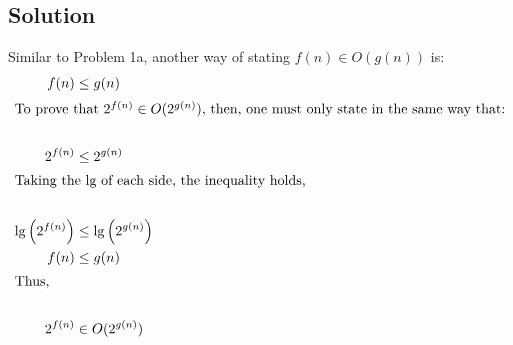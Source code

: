 \subsection*{Solution}
Similar to Problem 1a, another way of stating $f(n) \in O(g(n))$ is: 
\begin{align*}
  f(n) &\le g(n) \\
  \intertext{To prove that $2^{f(n)} \in O(2^{g(n)})$, then, one must only state in the same way that:} \\
  2^{f(n)} &\le 2^{g(n)} \\
  \intertext{Taking the lg of each side, the inequality holds,} \\
  \lg\left(2^{f(n)}\right) &\le \lg\left(2^{g(n)}\right) \\
  f(n) &\le g(n) \\
  \intertext{Thus,} \\
  2^{f(n)} &\in O(2^{g(n)}) \\
\end{align*}

